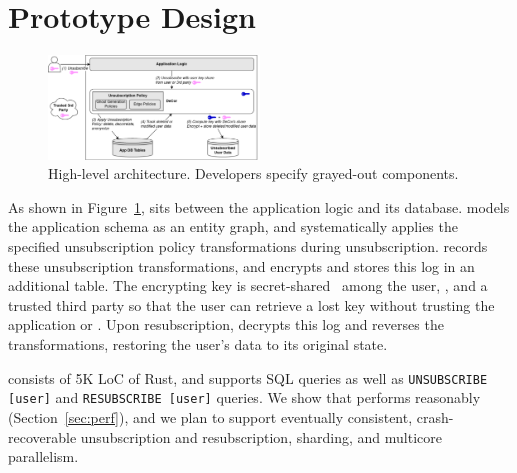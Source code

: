 \section{Prototype Design}
\label{sec:proto}

\begin{figure}[t!]
    \centering
    \includegraphics[width=0.5\textwidth]{img/releaser_arch}

    \caption{High-level \sys architecture. Developers specify grayed-out components.}
    \label{fig:arch}
\end{figure}

As shown in Figure~\ref{fig:arch}, \sys sits between the application logic and its database. \sys
models the application schema as an entity graph, and systematically applies the specified
unsubscription policy transformations during unsubscription.
\sys records these unsubscription transformations, and encrypts and stores this
log in an additional table. The encrypting key is secret-shared~\cite{secretsharing} among the user,
\sys, and a trusted third party so that the user can retrieve a lost key without trusting the
application or \sys. Upon resubscription, \sys decrypts this log and reverses the transformations,
restoring the user's data to its original state.

\sys consists of 5K LoC of Rust, and supports SQL queries as well as \texttt{UNSUBSCRIBE
[user]} and \texttt{RESUBSCRIBE [user]} queries.
We show that \sys performs reasonably (Section~\ref{sec:perf}), and we plan to support eventually
consistent, crash-recoverable unsubscription and resubscription, sharding, and multicore parallelism.



